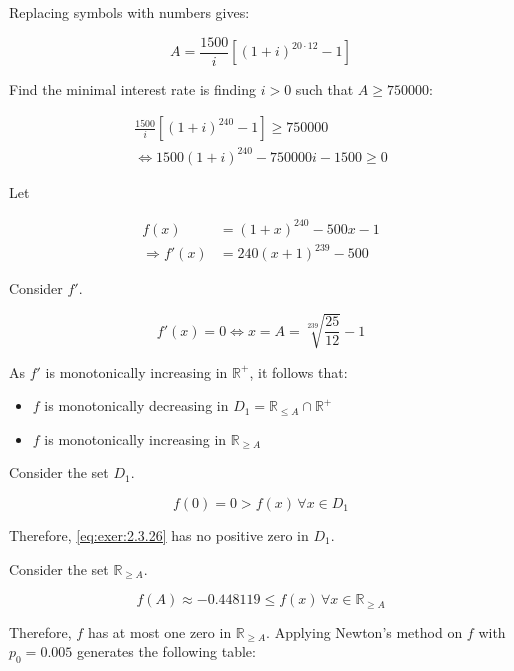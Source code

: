 \documentclass[../../../../Assignments]{subfiles}
\begin{document}
\begin{solution}
    Replacing symbols with numbers gives:

    \[A = \frac{\num{1500}}{i} [(1 + i)^{20 \cdot 12} - 1]\]

    Find the minimal interest rate is finding \(i > 0\) such that \(A \geq
    \num{750000}\):

    \begin{gather*}
        \frac{\num{1500}}{i} [(1 + i)^{240} - 1] \geq \num{750000} \\
        \iff \num{1500} (1 + i)^{240} - \num{750000} i - \num{1500} \geq 0 \tag{*}\label{eq:exer:2.3.26}
    \end{gather*}

    Let

    \begin{align*}
                     f(x) &= (1 + x)^{240} - 500x - 1 \\
        \Rightarrow f'(x) &= 240(x + 1)^{239} - 500
    \end{align*}

    Consider \(f'\).

    \[f'(x) = 0 \iff x = A = \sqrt[239]{\frac{25}{12}} - 1\]

    As \(f'\) is monotonically increasing in \(\mathbb{R}^+\), it follows that:

    \begin{itemize}
        \item \(f\) is monotonically decreasing in \(D_1 = \mathbb{R}_{\leq A} \cap \mathbb{R}^+\)
        \item \(f\) is monotonically increasing in \(\mathbb{R}_{\geq A}\)
    \end{itemize}

    Consider the set \(D_1\).

    \[f(0) = 0 > f(x) \, \forall x \in D_1\]

    Therefore, \eqref{eq:exer:2.3.26} has no positive zero in \(D_1\).

    Consider the set \(\mathbb{R}_{\geq A}\).

    \[f(A) \approx \num{-0.448119} \leq f(x) \, \forall x \in \mathbb{R}_{\geq A}\]

    Therefore, \(f\) has at most one zero in \(\mathbb{R}_{\geq A}\). Applying
    Newton's method on \(f\) with \(p_0 = \num{0.005}\) generates the following
    table:


\end{solution}
\end{document}
